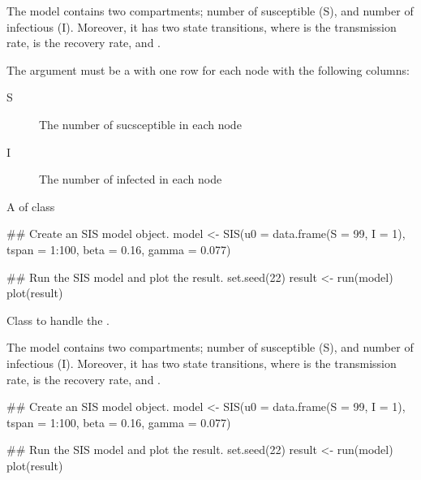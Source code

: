 \documentclass[letterpaper]{book}
\begin{document}
%
\begin{Details}
The  model contains two compartments; number of
susceptible (S), and number of infectious (I).  Moreover, it has
two state transitions,   where
\eqn{\beta}{} is the transmission rate, \eqn{\gamma}{} is the recovery
rate, and .

The argument  must be a  with one row for
each node with the following columns:
\begin{description}

\item[S] The number of sucsceptible in each node
\item[I] The number of infected in each node

\end{description}

\end{Details}
%
\begin{Value}
A  of class 
\end{Value}
%
\begin{Examples}
\begin{ExampleCode}
## Create an SIS model object.
model <- SIS(u0 = data.frame(S = 99, I = 1),
             tspan = 1:100,
             beta = 0.16,
             gamma = 0.077)

## Run the SIS model and plot the result.
set.seed(22)
result <- run(model)
plot(result)
\end{ExampleCode}
\end{Examples}
%
\begin{Description}
Class to handle the  .
\end{Description}
%
\begin{Details}
The  model contains two compartments; number of
susceptible (S), and number of infectious (I).  Moreover, it has
two state transitions,   where
\eqn{\beta}{} is the transmission rate, \eqn{\gamma}{} is the recovery
rate, and .
\end{Details}
%
\begin{Examples}
\begin{ExampleCode}
## Create an SIS model object.
model <- SIS(u0 = data.frame(S = 99, I = 1),
             tspan = 1:100,
             beta = 0.16,
             gamma = 0.077)

## Run the SIS model and plot the result.
set.seed(22)
result <- run(model)
plot(result)
\end{ExampleCode}
\end{Examples}
\end{document}
